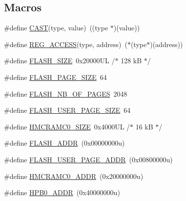 \subsection*{Macros}
\begin{DoxyCompactItemize}
\item 
\#define \mbox{\hyperlink{group___s_a_m_d21_g17_a_u__definitions_ga015dfee129875688293180ddef474138}{C\+A\+ST}}(type,  value)~((type $\ast$)(value))
\item 
\#define \mbox{\hyperlink{group___s_a_m_d21_g17_a_u__definitions_gad9dd6ceb323c1d2d3caf66d30ea9a47b}{R\+E\+G\+\_\+\+A\+C\+C\+E\+SS}}(type,  address)~($\ast$(type$\ast$)(address))
\item 
\#define \mbox{\hyperlink{group___s_a_m_d21_g17_a_u__definitions_gae69620948dea1b76e0ab7843ab719db7}{F\+L\+A\+S\+H\+\_\+\+S\+I\+ZE}}~0x20000\+U\+L /$\ast$ 128 k\+B $\ast$/
\item 
\#define \mbox{\hyperlink{group___s_a_m_d21_g17_a_u__definitions_ga4cc14e2c99ae7f8e5a8e371d03c8532c}{F\+L\+A\+S\+H\+\_\+\+P\+A\+G\+E\+\_\+\+S\+I\+ZE}}~64
\item 
\#define \mbox{\hyperlink{group___s_a_m_d21_g17_a_u__definitions_ga264f8ab3607e09ec028c32cb7538fd91}{F\+L\+A\+S\+H\+\_\+\+N\+B\+\_\+\+O\+F\+\_\+\+P\+A\+G\+ES}}~2048
\item 
\#define \mbox{\hyperlink{group___s_a_m_d21_g17_a_u__definitions_ga595d6fe8572383d794338e55614a5a7f}{F\+L\+A\+S\+H\+\_\+\+U\+S\+E\+R\+\_\+\+P\+A\+G\+E\+\_\+\+S\+I\+ZE}}~64
\item 
\#define \mbox{\hyperlink{group___s_a_m_d21_g17_a_u__definitions_gaaf0b3acc28d2637a807c6c6c033a63a6}{H\+M\+C\+R\+A\+M\+C0\+\_\+\+S\+I\+ZE}}~0x4000\+U\+L /$\ast$ 16 k\+B $\ast$/
\item 
\#define \mbox{\hyperlink{group___s_a_m_d21_g17_a_u__definitions_ga485a21e55bcc66416a04d2fec83513fa}{F\+L\+A\+S\+H\+\_\+\+A\+D\+DR}}~(0x00000000u)
\item 
\#define \mbox{\hyperlink{group___s_a_m_d21_g17_a_u__definitions_ga263dc504b29b21d616514ac65000957e}{F\+L\+A\+S\+H\+\_\+\+U\+S\+E\+R\+\_\+\+P\+A\+G\+E\+\_\+\+A\+D\+DR}}~(0x00800000u)
\item 
\#define \mbox{\hyperlink{group___s_a_m_d21_g17_a_u__definitions_gab60016bed594251a4955f546002d126f}{H\+M\+C\+R\+A\+M\+C0\+\_\+\+A\+D\+DR}}~(0x20000000u)
\item 
\#define \mbox{\hyperlink{group___s_a_m_d21_g17_a_u__definitions_gaa3dc0741f009f571f4a45086601718f6}{H\+P\+B0\+\_\+\+A\+D\+DR}}~(0x40000000u)
\item 

\end{DoxyCompactItemize}

